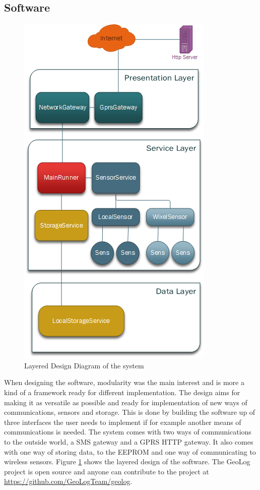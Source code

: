 \subsection{Software}
\begin{figure}
\centering
\includegraphics[width=0.6\linewidth]{graphics/Layering}
\caption{Layered Design Diagram of the system\label{fig:Layering}}
\end{figure}
When designing the software, modularity was the main interest and is more a kind of
a framework ready for different implementation. The design aims for making
it as versatile as possible and ready for implementation of new ways of communications, sensors and storage. This is done by building the software up of three interfaces the user needs to implement if for example another means of communications is needed. The system comes with two ways of communications to the outside world, a SMS gateway and a GPRS HTTP gateway. It also comes with one way of storing data, to the EEPROM and one way of communicating to wireless sensors. Figure \ref{fig:Layering} shows the layered design of the software. The GeoLog project is open source and anyone can contribute
to the project at \url{https://github.com/GeoLogTeam/geolog}.

